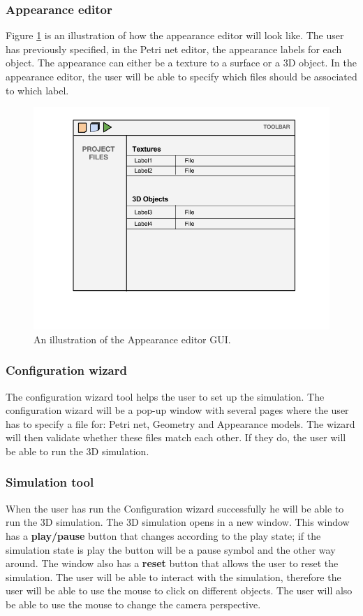 \subsubsection{Appearance editor}
Figure \ref{fig:appearance_editor} is an illustration of how the appearance editor will look like. The user has previously specified, in the Petri net editor, the appearance labels for each object. The appearance can either be a texture to a surface or a 3D object. In the appearance editor, the user will be able to specify which files should be associated to which label. 

\begin{figure}[ht]
\begin{center}
\includegraphics[scale=0.5]{image/appearance.png}
\caption{An illustration of the Appearance editor GUI.}
\label{fig:appearance_editor}
\end{center}
\end{figure}

\subsubsection{Configuration wizard}
The configuration wizard tool helps the user to set up the simulation. The configuration wizard will be a pop-up window with several pages where the user has to specify a file for: Petri net, Geometry and Appearance models. The wizard will then validate whether these files match each other. If they do, the user will be able to run the 3D simulation. 

\subsubsection{Simulation tool}
When the user has run the Configuration wizard successfully he will be able to run the 3D simulation. The 3D simulation opens in a new window. This window has a \textbf{play/pause} button that changes according to the play state; if the simulation state is play the button will be a pause symbol and the other way around. The window also has a \textbf{reset} button that allows the user to reset the simulation.
The user will be able to interact with the simulation, therefore the user will be able to use the mouse to click on different objects. The user will also be able to use the mouse to change the camera perspective.

